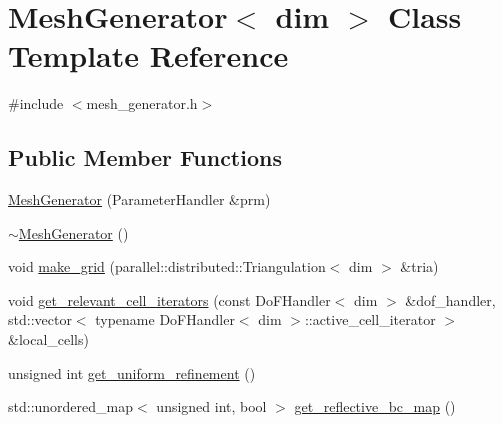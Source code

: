\hypertarget{class_mesh_generator}{}\section{Mesh\+Generator$<$ dim $>$ Class Template Reference}
\label{class_mesh_generator}


{\ttfamily \#include $<$mesh\+\_\+generator.\+h$>$}

\subsection*{Public Member Functions}
\begin{DoxyCompactItemize}
\item 
\hyperlink{class_mesh_generator_aaf711e4f4d1702dd2f91b8dc3d425765}{Mesh\+Generator} (Parameter\+Handler \&prm)
\item 
\hyperlink{class_mesh_generator_aa8a590f00d9732424e56f54bcc2b6339}{$\sim$\+Mesh\+Generator} ()
\item 
void \hyperlink{class_mesh_generator_a27c6ff0b0c51700373ef9a1dc10abaaf}{make\+\_\+grid} (parallel\+::distributed\+::\+Triangulation$<$ dim $>$ \&tria)
\item 
void \hyperlink{class_mesh_generator_a0c5f845cf8476424892eb7b263672e73}{get\+\_\+relevant\+\_\+cell\+\_\+iterators} (const Do\+F\+Handler$<$ dim $>$ \&dof\+\_\+handler, std\+::vector$<$ typename Do\+F\+Handler$<$ dim $>$\+::active\+\_\+cell\+\_\+iterator $>$ \&local\+\_\+cells)
\item 
unsigned int \hyperlink{class_mesh_generator_aabb238d5d787e8c9834e4a31d2cc5ea9}{get\+\_\+uniform\+\_\+refinement} ()
\item 
std\+::unordered\+\_\+map$<$ unsigned int, bool $>$ \hyperlink{class_mesh_generator_a525754e676dca1ed4ffac34f63a5d1ae}{get\+\_\+reflective\+\_\+bc\+\_\+map} ()
\end{DoxyCompactItemize}
